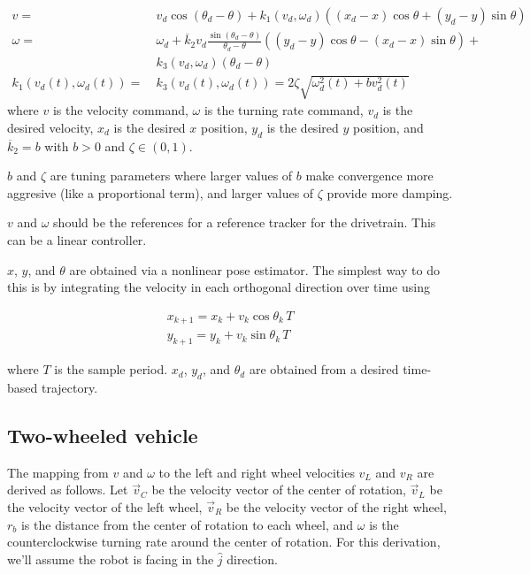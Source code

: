 \begin{theorem}
  \begin{align}
    v =~& v_d \cos(\theta_d - \theta) + k_1(v_d, \omega_d)((x_d - x)\cos\theta +
      (y_d - y)\sin\theta) \\
    \omega =~& \omega_d +
      \overline{k}_2 v_d\frac{\sin(\theta_d - \theta)}{\theta_d - \theta}
      ((y_d - y)\cos\theta - (x_d - x)\sin\theta) + \nonumber \\
      &k_3 (v_d, \omega_d)(\theta_d - \theta) \\
    k_1(v_d(t), \omega_d(t)) =~& k_3(v_d(t), \omega_d(t)) =
      2\zeta\sqrt{\omega_d^2(t) + bv_d^2(t)}
  \end{align}
  where $v$ is the velocity command, $\omega$ is the turning rate command, $v_d$
  is the desired velocity, $x_d$ is the desired $x$ position, $y_d$ is the
  desired $y$ position, and $\overline{k}_2 = b$ with $b > 0$ and
  $\zeta \in (0, 1)$.

  $b$ and $\zeta$ are tuning parameters where larger values of $b$ make
  convergence more aggresive (like a proportional term), and larger values of
  $\zeta$ provide more damping.
\end{theorem}

$v$ and $\omega$ should be the \glspl{reference} for a \gls{reference} tracker
for the drivetrain. This can be a linear controller.

$x$, $y$, and $\theta$ are obtained via a nonlinear \gls{pose} estimator. The
simplest way to do this is by integrating the velocity in each orthogonal
direction over time using

\begin{align*}
  x_{k+1} = x_k + v_k\cos\theta_k\,T \\
  y_{k+1} = y_k + v_k\sin\theta_k\,T
\end{align*}

where $T$ is the sample period. $x_d$, $y_d$, and $\theta_d$ are obtained from a
desired time-based trajectory.

\subsection{Two-wheeled vehicle}

The mapping from $v$ and $\omega$ to the left and right wheel velocities $v_L$
and $v_R$ are derived as follows. Let $\vec{v}_C$ be the velocity vector of the
center of rotation, $\vec{v}_L$ be the velocity vector of the left wheel,
$\vec{v}_R$ be the velocity vector of the right wheel, $r_b$ is the distance
from the center of rotation to each wheel, and $\omega$ is the counterclockwise
turning rate around the center of rotation. For this derivation, we'll assume
the robot is facing in the $\hat{j}$ direction.

